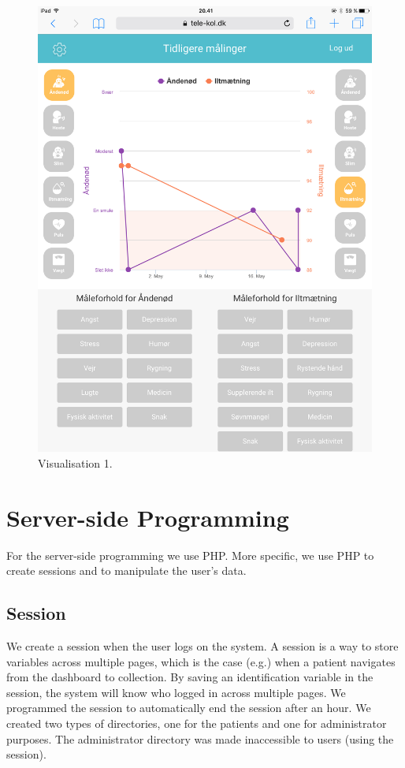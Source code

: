 \begin{figure}[h]
\begin{minipage}[b]{0.45\textwidth}
    \includegraphics[width=\textwidth]{images/implementation/v1Imp.PNG}
    \caption{Visualisation 1.}
    \label{fig:visualization}
  \end{minipage}
\end{figure}



\section{Server-side Programming}
For the server-side programming we use PHP. More specific, we use PHP to create sessions and to manipulate the user's data. 

\subsection{Session}
We create a session when the user logs on the system. A session is a way to store variables across multiple pages, which is the case (e.g.) when a patient navigates from the dashboard to collection. By saving an identification variable in the session, the system will know who logged in across multiple pages. We programmed the session to automatically end the session after an hour. We created two types of directories, one for the patients and one for administrator purposes. The administrator directory was made inaccessible to users (using the session).

